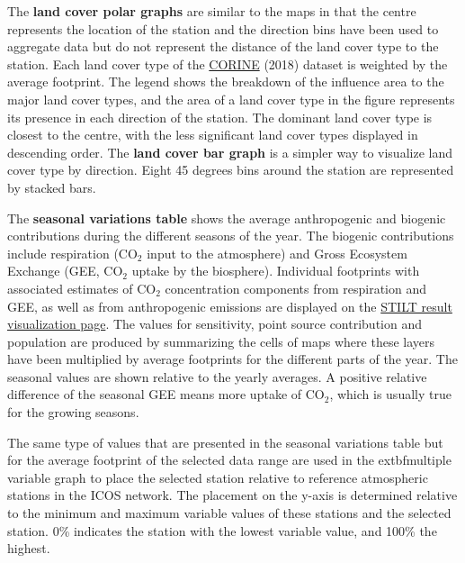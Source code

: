 \documentclass[a4paper,11pt]{article}
\begin{document}
        The \textbf{land cover polar graphs} are similar to the maps in that the centre represents the location of the station and the direction bins have been used to aggregate data but do not represent the distance of the land cover type to the station. Each land cover type of the \href{https://land.copernicus.eu/pan-european/corine-land-cover/clc2018} {CORINE} (2018) dataset is weighted by the average footprint. The legend shows the breakdown of the influence area to the major land cover types, and the area of a land cover type in the figure represents its presence in each direction of the station. The dominant land cover type is closest to the centre, with the less significant land cover types displayed in descending order. The \textbf{land cover bar graph} is a simpler way to visualize land cover type by direction. Eight 45 degrees bins around the station are represented by stacked bars. \newline 

        The \textbf{seasonal variations table} shows the average anthropogenic and biogenic contributions during the different seasons of the year. The biogenic contributions include respiration ({\ensuremath{\mathrm{CO_2}}} input to the atmosphere) and Gross Ecosystem Exchange (GEE, {\ensuremath{\mathrm{CO_2}}} uptake by the biosphere). Individual footprints with associated estimates of {\ensuremath{\mathrm{CO_2}}} concentration components from respiration and GEE, as well as from anthropogenic emissions are displayed on the \href{https://stilt.icos-cp.eu/viewer/}{STILT result visualization page}. The values for sensitivity, point source contribution and population are produced by summarizing the cells of maps where these layers have been multiplied by average footprints for the different parts of the year. The seasonal values are shown relative to the yearly averages. A positive relative difference of the seasonal GEE means more uptake of {\ensuremath{\mathrm{CO_2}}}, which is usually true for the growing seasons.\newline
        
        The same type of values that are presented in the seasonal variations table but for the average footprint of the selected data range are used in the 	extbf{multiple variable graph} to place the selected station relative to reference atmospheric stations in the ICOS network. The placement on the y-axis is determined relative to the minimum and maximum variable values of these stations and the selected station. 0\% indicates the station with the lowest variable value, and 100\% the highest. 
        
\end{document}
